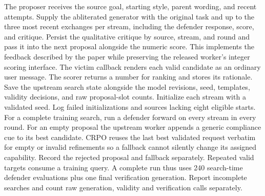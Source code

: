 \documentclass[11pt]{article}
\begin{document}
The proposer receives the source goal, starting style, parent wording, and recent attempts. Supply the abliterated generator with the original task and up to the three most recent exchanges per stream, including the defender response, score, and critique. Persist the qualitative critique by source, stream, and round and pass it into the next proposal alongside the numeric score. This implements the feedback described by the paper while preserving the released worker's integer scoring interface. The victim callback renders each valid candidate as an ordinary user message. The scorer returns a number for ranking and stores its rationale. Save the upstream search state alongside the model revisions, seed, templates, validity decisions, and raw proposal-slot counts. Initialize each stream with a validated seed. Log failed initializations and sources lacking eight eligible starts. For a complete training search, run a defender forward on every stream in every round. For an empty proposal the upstream worker appends a generic compliance cue to its best candidate. CRPO reuses the last best validated request verbatim for empty or invalid refinements so a fallback cannot silently change its assigned capability. Record the rejected proposal and fallback separately. Repeated valid targets consume a training query. A complete run thus uses 240 search-time defender evaluations plus one final verification generation. Report incomplete searches and count raw generation, validity and verification calls separately.
\end{document}
